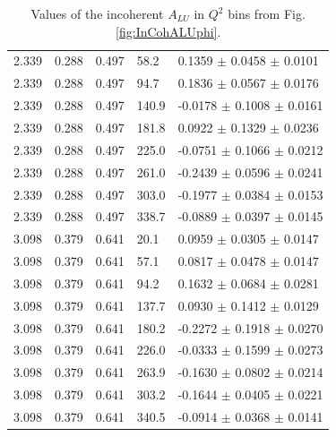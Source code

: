 \documentclass[aps,prc,preprint,superscriptaddress]{revtex4}
\begin{document}
\begin{table}[!h]
\begin{center}
\begin{tabular}{||l|l|l|l|l||}
  2.339 & 0.288 & 0.497  &  58.2  &  0.1359  $\pm$  0.0458  $\pm$ 0.0101 \\
  2.339 & 0.288 & 0.497  &  94.7  &  0.1836  $\pm$  0.0567  $\pm$ 0.0176 \\
  2.339 & 0.288 & 0.497  & 140.9  & -0.0178  $\pm$  0.1008  $\pm$ 0.0161 \\
  2.339 & 0.288 & 0.497  & 181.8  &  0.0922  $\pm$  0.1329  $\pm$ 0.0236 \\
  2.339 & 0.288 & 0.497  & 225.0  & -0.0751  $\pm$  0.1066  $\pm$ 0.0212 \\
  2.339 & 0.288 & 0.497  & 261.0  & -0.2439  $\pm$  0.0596  $\pm$ 0.0241 \\
  2.339 & 0.288 & 0.497  & 303.0  & -0.1977  $\pm$  0.0384  $\pm$ 0.0153 \\
  2.339 & 0.288 & 0.497  & 338.7  & -0.0889  $\pm$  0.0397  $\pm$ 0.0145 \\
  \hline                                                              
  3.098 & 0.379 & 0.641  & 20.1   & 0.0959   $\pm$  0.0305  $\pm$ 0.0147 \\ 
  3.098 & 0.379 & 0.641  & 57.1   & 0.0817   $\pm$  0.0478  $\pm$ 0.0147 \\
  3.098 & 0.379 & 0.641  & 94.2   & 0.1632   $\pm$  0.0684  $\pm$ 0.0281 \\
  3.098 & 0.379 & 0.641  &137.7   & 0.0930   $\pm$  0.1412  $\pm$ 0.0129 \\
  3.098 & 0.379 & 0.641  &180.2   &-0.2272   $\pm$  0.1918  $\pm$ 0.0270 \\
  3.098 & 0.379 & 0.641  &226.0   &-0.0333   $\pm$  0.1599  $\pm$ 0.0273 \\
  3.098 & 0.379 & 0.641  &263.9   &-0.1630   $\pm$  0.0802  $\pm$ 0.0214 \\
  3.098 & 0.379 & 0.641  &303.2   &-0.1644   $\pm$  0.0405  $\pm$ 0.0221 \\
  3.098 & 0.379 & 0.641  &340.5   &-0.0914   $\pm$  0.0368  $\pm$ 0.0141 \\
 \hline
 \hline
      \end{tabular}
      \caption{Values of the incoherent $A_{LU}$ in $Q^2$ bins from Fig. \ref{fig:InCohALUphi}.}
      \label{table:InCoh_Q2_BSA}
   \end{center}
\end{table}
\end{document}
